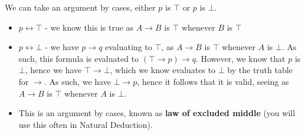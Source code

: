 \documentclass[a4paper, 12pt]{article}
\begin{document}
        We can take an argument by cases, either $p$ is $\top$ or $p$ is $\bot$.
        \begin{itemize}
            \item $p \leftrightarrow \top$ - we know this is true as $A \rightarrow B$ is $\top$ whenever $B$ is $\top$
            \item $p \leftrightarrow \bot$ - we have $p \rightarrow q$ evaluating to $\top$, as $A \rightarrow B$ is $\top$ whenever $A$ is $\bot$. As such, this formula is evaluated to $(\top \rightarrow p) \rightarrow q$. However, we know that $p$ is $\bot$, hence we have $\top \rightarrow \bot$, which we know evaluates to $\bot$ by the truth table for $\rightarrow$. As such, we have $\bot \rightarrow p$, hence it follows that it is valid, seeing as $A \rightarrow B$ is $\top$ whenever $A$ is $\bot$.
            \item This is an argument by cases, known as \textbf{law of excluded middle} (you will use this often in Natural Deduction).
        \end{itemize}
\end{document}
